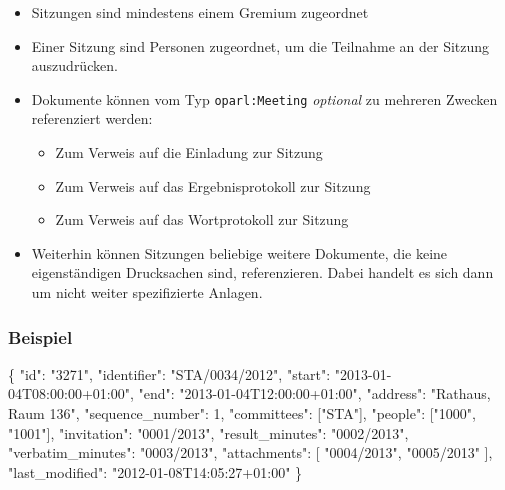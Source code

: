 \documentclass[,a4paper]{article}
\newenvironment{Shaded}{}{}
\newcommand{\DataTypeTok}[1]{\textcolor[rgb]{0.56,0.13,0.00}{{#1}}}
\newcommand{\DecValTok}[1]{\textcolor[rgb]{0.25,0.63,0.44}{{#1}}}
\newcommand{\StringTok}[1]{\textcolor[rgb]{0.25,0.44,0.63}{{#1}}}
\newcommand{\NormalTok}[1]{{#1}}
\begin{document}
\begin{itemize}
\itemsep1pt\parskip0pt
\item
  Sitzungen sind mindestens einem Gremium zugeordnet
\item
  Einer Sitzung sind Personen zugeordnet, um die Teilnahme an der
  Sitzung auszudrücken.
\item
  Dokumente können vom Typ \texttt{oparl:Meeting} \emph{optional} zu
  mehreren Zwecken referenziert werden:

  \begin{itemize}
  \itemsep1pt\parskip0pt
  \item
    Zum Verweis auf die Einladung zur Sitzung
  \item
    Zum Verweis auf das Ergebnisprotokoll zur Sitzung
  \item
    Zum Verweis auf das Wortprotokoll zur Sitzung
  \end{itemize}
\item
  Weiterhin können Sitzungen beliebige weitere Dokumente, die keine
  eigenständigen Drucksachen sind, referenzieren. Dabei handelt es sich
  dann um nicht weiter spezifizierte Anlagen.
\end{itemize}

\subsubsection{Beispiel}\label{beispiel}

\begin{Shaded}
\begin{Highlighting}[]
\NormalTok{\{}
    \DataTypeTok{"id"}\NormalTok{: }\StringTok{"3271"}\NormalTok{,}
    \DataTypeTok{"identifier"}\NormalTok{: }\StringTok{"STA/0034/2012"}\NormalTok{,}
    \DataTypeTok{"start"}\NormalTok{: }\StringTok{"2013-01-04T08:00:00+01:00"}\NormalTok{,}
    \DataTypeTok{"end"}\NormalTok{: }\StringTok{"2013-01-04T12:00:00+01:00"}\NormalTok{,}
    \DataTypeTok{"address"}\NormalTok{: }\StringTok{"Rathaus, Raum 136"}\NormalTok{,}
    \DataTypeTok{"sequence_number"}\NormalTok{: }\DecValTok{1}\NormalTok{,}
    \DataTypeTok{"committees"}\NormalTok{: [}\StringTok{"STA"}\NormalTok{],}
    \DataTypeTok{"people"}\NormalTok{: [}\StringTok{"1000"}\NormalTok{, }\StringTok{"1001"}\NormalTok{],}
    \DataTypeTok{"invitation"}\NormalTok{: }\StringTok{"0001/2013"}\NormalTok{,}
    \DataTypeTok{"result_minutes"}\NormalTok{: }\StringTok{"0002/2013"}\NormalTok{,}
    \DataTypeTok{"verbatim_minutes"}\NormalTok{: }\StringTok{"0003/2013"}\NormalTok{,}
    \DataTypeTok{"attachments"}\NormalTok{: [}
        \StringTok{"0004/2013"}\NormalTok{,}
        \StringTok{"0005/2013"}
    \NormalTok{],}
    \DataTypeTok{"last_modified"}\NormalTok{: }\StringTok{"2012-01-08T14:05:27+01:00"}
\NormalTok{\}}
\end{Highlighting}
\end{Shaded}
\end{document}
